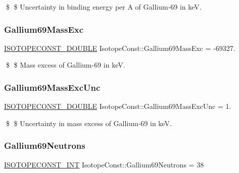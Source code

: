 \$ \$ Uncertainty in binding energy per A of Gallium-\/69 in keV. \mbox{\label{group___isotope_const-_gallium-_ga69_gab4a83608c4f4759233cd0fbb12806af9}} 
\subsubsection{\texorpdfstring{Gallium69\+Mass\+Exc}{Gallium69MassExc}}
{\footnotesize\ttfamily \mbox{\hyperlink{group___isotope_const-_macros_ga8f45a7272ce02c0b4c65c44636ed719a}{I\+S\+O\+T\+O\+P\+E\+C\+O\+N\+S\+T\+\_\+\+D\+O\+U\+B\+LE}} Isotope\+Const\+::\+Gallium69\+Mass\+Exc = -\/69327.}

\$ \$ Mass excess of Gallium-\/69 in keV. \mbox{\label{group___isotope_const-_gallium-_ga69_ga8cad4f84a1279432c00bd6cc5f64ea79}} 
\subsubsection{\texorpdfstring{Gallium69\+Mass\+Exc\+Unc}{Gallium69MassExcUnc}}
{\footnotesize\ttfamily \mbox{\hyperlink{group___isotope_const-_macros_ga8f45a7272ce02c0b4c65c44636ed719a}{I\+S\+O\+T\+O\+P\+E\+C\+O\+N\+S\+T\+\_\+\+D\+O\+U\+B\+LE}} Isotope\+Const\+::\+Gallium69\+Mass\+Exc\+Unc = 1.}

\$ \$ Uncertainty in mass excess of Gallium-\/69 in keV. \mbox{\label{group___isotope_const-_gallium-_ga69_ga0807d182f2f281e1d81d0f0765cf5741}} 
\subsubsection{\texorpdfstring{Gallium69\+Neutrons}{Gallium69Neutrons}}
{\footnotesize\ttfamily \mbox{\hyperlink{group___isotope_const-_macros_ga5f18360b3e99483a35c32d789e62621c}{I\+S\+O\+T\+O\+P\+E\+C\+O\+N\+S\+T\+\_\+\+I\+NT}} Isotope\+Const\+::\+Gallium69\+Neutrons = 38}

